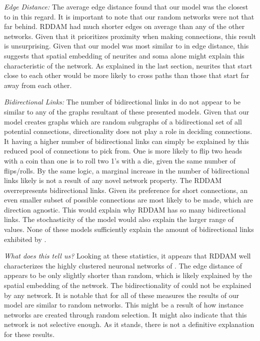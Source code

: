 \textit{Edge Distance:} The average edge distance found that our model was the closest to \ce in this regard. It is important to note that our random networks were not that far behind. RDDAM had much shorter edges on average than any of the other networks. Given that it prioritizes proximity when making connections, this result is unsurprising. Given that our model was most similar to \ce in edge distance, this suggests that spatial embedding of neurites and soma alone might explain this characteristic of the network. As explained in the last section, neurites that start close to each other would be more likely to cross paths than those that start far away from each other.

\textit{Bidirectional Links:} The number of bidirectional links in \ce do not appear to be similar to any of the graphs resultant of these presented models. Given that our model creates graphs which are random subgraphs of a bidirectional set of all potential connections, directionality does not play a role in deciding connections. It having a higher number of bidirectional links can simply be explained by this reduced pool of connections to pick from. One is more likely to flip two heads with a coin than one is to roll two 1's with a die, given the same number of flips/rolls. By the same logic, a marginal increase in the number of bidirectional links likely is not a result of any novel network property.
The RDDAM overrepresents bidirectional links. Given its preference for short connections, an even smaller subset of possible connections are most likely to be made, which are direction agnostic. This would explain why RDDAM has so many bidirectional links. The stochasticity of the model would also explain the larger range of values. None of these models sufficiently explain the amount of bidirectional links exhibited by \ce. 




\textit{What does this tell us?} Looking at these statistics, it appears that RDDAM well characterizes the highly clustered neuronal networks of \ce. The edge distance of \ce appears to be only slightly shorter than random, which is likely explained by the spatial embedding of the network. The bidirectionality of \ce could not be explained by any network. 
It is notable that for all of these measures the results of our model are similar to random networks. This might be a result of how instance networks are created through random selection. It might also indicate that this network is not selective enough. As it stands, there is not a definitive explanation for these results.

